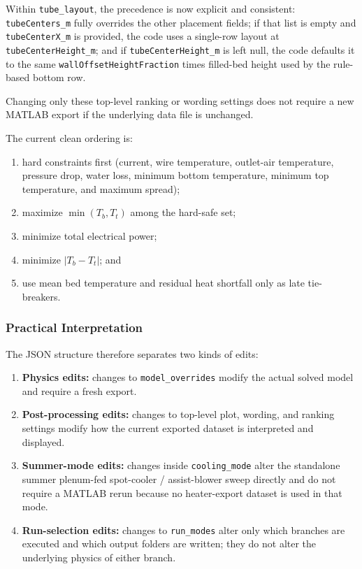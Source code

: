 \documentclass{article}
\begin{document}
Within \texttt{tube\_layout}, the precedence is now explicit and consistent:
\texttt{tubeCenters\_m} fully overrides the other placement fields; if that
list is empty and \texttt{tubeCenterX\_m} is provided, the code uses a
single-row layout at \texttt{tubeCenterHeight\_m}; and if
\texttt{tubeCenterHeight\_m} is left null, the code defaults it to the same
\texttt{wallOffsetHeightFraction} times filled-bed height used by the
rule-based bottom row.

Changing only these top-level ranking or wording settings does not require a
new MATLAB export if the underlying data file is unchanged.

The current clean ordering is:
\begin{enumerate}
\item hard constraints first (current, wire temperature, outlet-air
      temperature, pressure drop, water loss, minimum bottom temperature,
      minimum top temperature, and maximum spread);
\item maximize $\min(T_b,T_t)$ among the hard-safe set;
\item minimize total electrical power;
\item minimize $|T_b-T_t|$; and
\item use mean bed temperature and residual heat shortfall only as late
      tie-breakers.
\end{enumerate}

\subsubsection{Practical Interpretation}

The JSON structure therefore separates two kinds of edits:
\begin{enumerate}
\item \textbf{Physics edits:} changes to \texttt{model\_overrides} modify the
      actual solved model and require a fresh export.
\item \textbf{Post-processing edits:} changes to top-level plot, wording, and
      ranking settings modify how the current exported dataset is interpreted
      and displayed.
\item \textbf{Summer-mode edits:} changes inside \texttt{cooling\_mode} alter
      the standalone summer plenum-fed spot-cooler / assist-blower sweep directly and do not
      require a MATLAB rerun because no heater-export dataset is used in that
      mode.
\item \textbf{Run-selection edits:} changes to \texttt{run\_modes} alter only
      which branches are executed and which output folders are written; they
      do not alter the underlying physics of either branch.
\end{enumerate}
\end{document}
